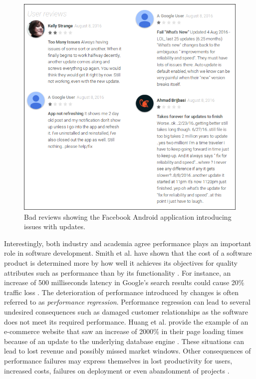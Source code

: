 \begin{figure}[h]
	\centering
	\includegraphics[width=\linewidth]{introduction/images/bad_reviews.png}
	\caption{Bad reviews showing the Facebook Android application introducing issues with updates.}
	\label{fig:facebook_bad_reviews}
\end{figure}

Interestingly, both industry and academia agree performance plays an important role in software development.
Smith et al. have shown that the cost of a software product is determined more by how well it achieves its objectives for quality attributes such as performance than by its functionality \cite{smith2003software}.
For instance, an increase of 500 milliseconds latency in Google's search results could cause 20\% traffic loss \cite{mayer2009search}.  
The deterioration of performance introduced by changes is often referred to as \emph{performance regression}.
Performance regression can lead to several undesired consequences such as damaged customer relationships as the software does not meet its required performance.
Huang et al. provide the example of an e-commerce website that saw an increase of 2000\% in their page loading times because of an update to the underlying database engine \cite{huang2014performance}.
These situations can lead to lost revenue and possibly missed market windows.
Other consequences of performance failures may express themselves in lost productivity for users, increased costs, failures on deployment or even abandonment of projects \cite{woodside2007future, williams1998performance}.

